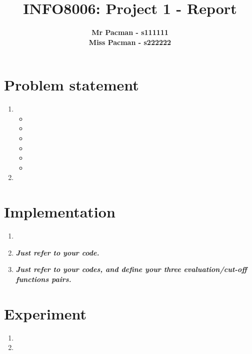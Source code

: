 \documentclass{article}
\begin{document}

\title{\Large{INFO8006: Project 1 - Report}}
\vspace{1cm}
\author{\small{\bf Mr Pacman - s111111} \\ \small{\bf Miss Pacman - s222222}}

\maketitle


\section{Problem statement}

\begin{enumerate}[label=\alph*.,leftmargin=*]
    \item
    \begin{itemize}
        \item
        \item
        \item
        \item
        \item
        \item
    \end{itemize}
    \item
\end{enumerate}

\section{Implementation}

\begin{enumerate}[label=\alph*.,leftmargin=*]
    \item
    \item \textbf{\textit{Just refer to your code.}}
    \item \textbf{\textit{Just refer to your codes, and define your three evaluation/cut-off functions pairs.}}
\end{enumerate}

\section{Experiment}

\begin{enumerate}[label=\alph*.,leftmargin=*]
    \item
    \item
\end{enumerate}



\end{document}
